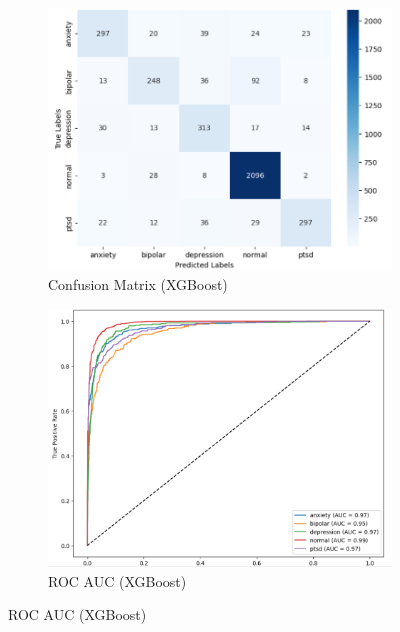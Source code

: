 \begin{figure}[h!]
    \centering
    \begin{subfigure}[b]{0.49\textwidth}
        \centering
        \includegraphics[width=\textwidth]{Images/XG Confusion Matrix.png}
        \caption*{Confusion Matrix (XGBoost)}
        \label{XGCM}  %
    \end{subfigure}
    \hfill
    \begin{subfigure}[b]{0.49\textwidth}
        \centering
        \includegraphics[width=\textwidth]{Images/XG ROC.png}
        \caption*{ROC AUC (XGBoost)}
        \label{XGROC}  %
    \end{subfigure}
    \label{fig:xgboost_comparison}
\end{figure}


